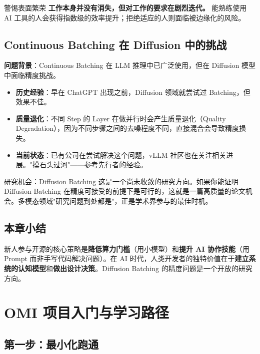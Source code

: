 \documentclass[a4paper]{article}
\begin{document}
\begin{warningbox}{警惕表面繁荣}
\textbf{工作本身并没有消失，但对工作的要求在剧烈迭代。} 能熟练使用 AI 工具的人会获得指数级的效率提升；拒绝适应的人则面临被边缘化的风险。
\end{warningbox}

\subsection{Continuous Batching 在 Diffusion 中的挑战}

\textbf{问题背景}：Continuous Batching 在 LLM 推理中已广泛使用，但在 Diffusion 模型中面临精度挑战。

\begin{itemize}
\item \textbf{历史经验}：早在 ChatGPT 出现之前，Diffusion 领域就尝试过 Batching，但效果不佳。
\item \textbf{质量退化}：不同 Step 的 Layer 在做并行时会产生质量退化（Quality Degradation），因为不同步骤之间的去噪程度不同，直接混合会导致精度损失。
\item \textbf{当前状态}：已有公司在尝试解决这个问题，vLLM 社区也在关注相关进展。"摸石头过河"——参考先行者的经验。
\end{itemize}

\begin{importantbox}{研究机会：Diffusion Batching}
这是一个尚未收敛的研究方向。如果你能证明 Diffusion Batching 在精度可接受的前提下是可行的，这就是一篇高质量的论文机会。多模态领域"研究问题到处都是"，正是学术界参与的最佳时机。
\end{importantbox}

\subsection{本章小结}

新人参与开源的核心策略是\textbf{降低算力门槛}（用小模型）和\textbf{提升 AI 协作技能}（用 Prompt 而非手写代码解决问题）。在 AI 时代，人类开发者的独特价值在于\textbf{建立系统的认知模型}和\textbf{做出设计决策}。Diffusion Batching 的精度问题是一个开放的研究方向。

\newpage

\section{OMI 项目入门与学习路径}

\subsection{第一步：最小化跑通}
\end{document}
